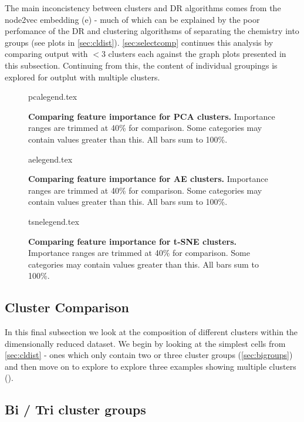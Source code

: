 The main inconcistency between clusters and DR algorithms comes from the node2vec embedding (e) - much of which can be explained by the poor perfomance of the DR and clustering algorithsms of separating the chemistry into groups (see plots in \autoref{sec:cldist}). \autoref{sec:selectcomp} continues this analysis by comparing output with $<3$ clusters each against the graph plots presented in this subsection. Continuing from this, the content of individual groupings is explored for outplut with multiple clusters.


\begin{figure}[H]
    {pcalegend.tex}
    \caption{\textbf{Comparing feature importance for PCA clusters.} Importance ranges are trimmed at 40\% for comparison. Some categories may contain values greater than this. All bars sum to 100\%.}
    \label{fig:pcalegend}
\end{figure}
\begin{figure}[H]
    {aelegend.tex}
    \caption{\textbf{Comparing feature importance for AE clusters.} Importance ranges are trimmed at 40\% for comparison. Some categories may contain values greater than this. All bars sum to 100\%. }
    \label{fig:aelegend}
\end{figure}
\begin{figure}[H]
    {tsnelegend.tex}
    \caption{\textbf{Comparing feature importance for t-SNE clusters.} Importance ranges are trimmed at 40\% for comparison. Some categories may contain values greater than this. All bars sum to 100\%.}
    \label{fig:tsnelegend}
\end{figure}


\subsection{Cluster Comparison}\label{sec:selectcomp}

In this final subsection we look at the composition of different clusters within the dimensionally reduced dataset. We begin by looking at the simplest cells from \autoref{sec:cldist} - ones which only contain two or three cluster groups (\autoref{sec:bigroups}) and then move on to explore to explore three examples showing multiple clusters (\label{sec:multigroups}).



\subsection{Bi / Tri cluster groups } \label{sec:bigroups}


